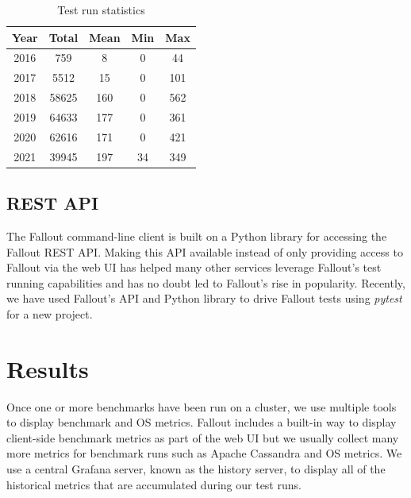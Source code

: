 \documentclass[a4paper,fleqn]{cas-dc}
\begin{document}
\begin{table}
\begin{center}
\begin{threeparttable}
\begin{tabular}{|c|c|c|c|c|} \hline \hline
Year & Total & Mean & Min & Max\\
\hline
2016 & 759 & 8 & 0 & 44 \\
2017 & 5512 & 15 & 0 & 101 \\
2018 & 58625 & 160 & 0 & 562 \\
2019 & 64633 & 177 & 0 & 361 \\
2020 & 62616 & 171 & 0 & 421 \\
2021 & 39945 & 197 & 34 & 349 \\
\hline
\end{tabular}
\caption{Test run statistics}\label{table1}
\end{threeparttable}
\end{center}
\end{table}

\subsection{REST API}

The Fallout command-line client is built on a Python library for accessing the Fallout REST API.
Making this API available instead of only providing access to Fallout via the web UI has helped
many other services leverage Fallout’s test running capabilities and has no doubt led to
Fallout’s rise in popularity. Recently, we have used Fallout’s API and Python library to drive
Fallout tests using \emph{pytest} for a new project.

\section{Results}\label{results}

Once one or more benchmarks have been run on a cluster, we use multiple tools to display benchmark
and OS metrics. Fallout includes a built-in way to display client-side benchmark metrics as part of
the web UI but we usually collect many more metrics for benchmark runs such as Apache Cassandra and
OS metrics. We use a central Grafana server, known as the history server, to display all of the
historical metrics that are accumulated during our test runs.
\end{document}
